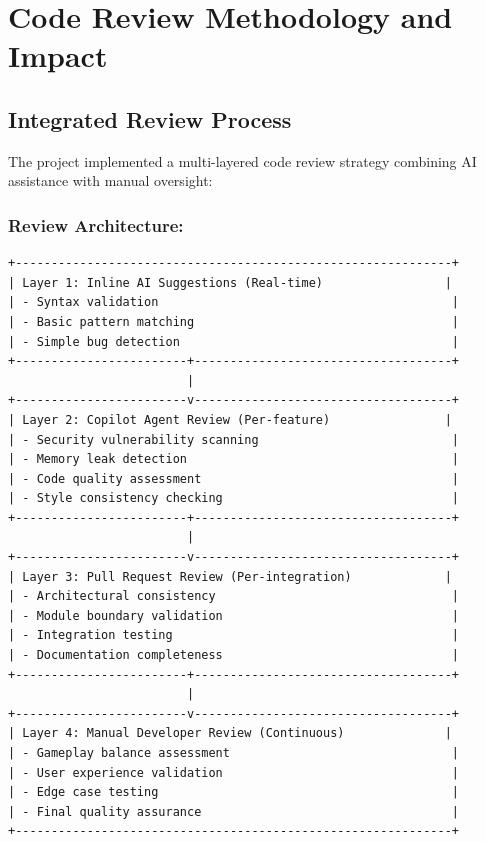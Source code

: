 \documentclass[12pt,a4paper]{article}
\begin{document}
\newpage

\section{Code Review Methodology and Impact}

\subsection{Integrated Review Process}

The project implemented a multi-layered code review strategy combining AI assistance with manual oversight:

\subsubsection*{Review Architecture:}

\begin{lstlisting}
+-------------------------------------------------------------+
| Layer 1: Inline AI Suggestions (Real-time)                 |
| - Syntax validation                                         |
| - Basic pattern matching                                    |
| - Simple bug detection                                      |
+------------------------+------------------------------------+
                         |
+------------------------v------------------------------------+
| Layer 2: Copilot Agent Review (Per-feature)                |
| - Security vulnerability scanning                           |
| - Memory leak detection                                     |
| - Code quality assessment                                   |
| - Style consistency checking                                |
+------------------------+------------------------------------+
                         |
+------------------------v------------------------------------+
| Layer 3: Pull Request Review (Per-integration)             |
| - Architectural consistency                                 |
| - Module boundary validation                                |
| - Integration testing                                       |
| - Documentation completeness                                |
+------------------------+------------------------------------+
                         |
+------------------------v------------------------------------+
| Layer 4: Manual Developer Review (Continuous)              |
| - Gameplay balance assessment                               |
| - User experience validation                                |
| - Edge case testing                                         |
| - Final quality assurance                                   |
+-------------------------------------------------------------+
\end{lstlisting}
\end{document}
